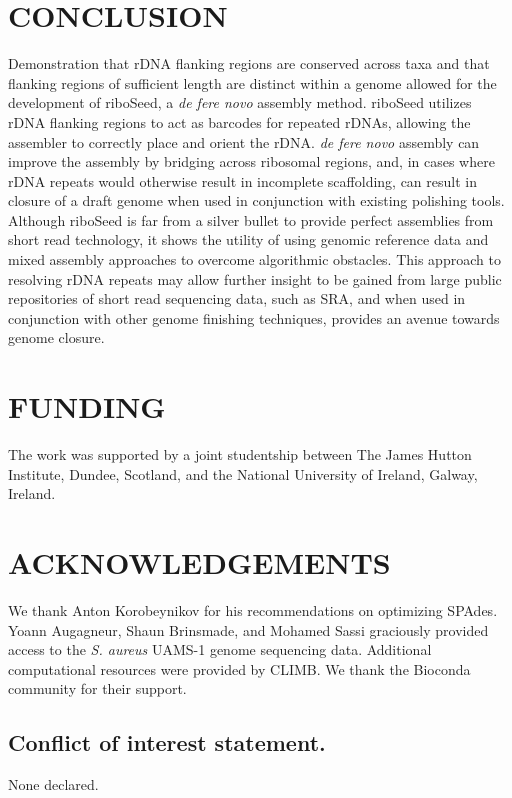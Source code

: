 \documentclass[a4,center,fleqn]{NAR}
\begin{document}
\section*{CONCLUSION}
Demonstration that rDNA flanking regions are conserved across taxa and that flanking regions of sufficient length are distinct within a genome allowed for the development of riboSeed, a \textit{de fere novo} assembly method. riboSeed  utilizes rDNA flanking regions to act as barcodes for repeated rDNAs, allowing the assembler to correctly place and orient the rDNA. \textit{de fere novo} assembly can improve the assembly by bridging across ribosomal regions, and, in cases where rDNA repeats would otherwise result in incomplete scaffolding, can result in closure of a draft genome when used in conjunction with existing polishing tools. Although riboSeed is far from a silver bullet to provide perfect assemblies from short read technology, it shows the utility of using genomic reference data and mixed assembly approaches to overcome algorithmic obstacles. This approach to resolving rDNA repeats may allow further insight to be gained from large public repositories of short read sequencing data, such as SRA, and when used in conjunction with other genome finishing techniques, provides an avenue towards genome closure.

\section{FUNDING}
The work was supported by a joint studentship between The James Hutton Institute, Dundee, Scotland, and the National University of Ireland, Galway, Ireland.


\section{ACKNOWLEDGEMENTS}
We thank Anton Korobeynikov for his recommendations on optimizing SPAdes. Yoann Augagneur, Shaun Brinsmade, and Mohamed Sassi graciously provided access to the \textit{S. aureus} UAMS-1 genome sequencing data.  Additional computational resources were provided by CLIMB\cite{Connor2016}. We thank the Bioconda\cite{Dale2017} community for their support.


\subsection{Conflict of interest statement.}
None declared.



\end{document}
